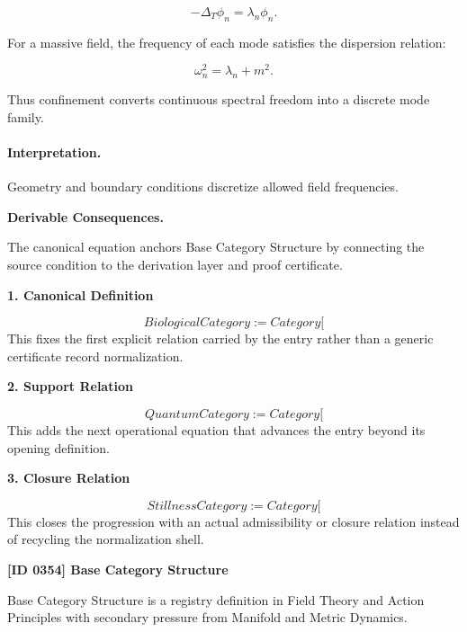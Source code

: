 \begin{equation}
-\Delta_T \phi_n = \lambda_n\phi_n .
\end{equation}

For a massive field, the frequency of each mode satisfies the dispersion relation:

\begin{equation}
\omega_n^2=\lambda_n+m^2 .
\end{equation}

Thus confinement converts continuous spectral freedom into a discrete mode family.

\paragraph{Interpretation.}
Geometry and boundary conditions discretize allowed field frequencies.

\par\vspace{0.35em}
\noindent\textbf{Derivable Consequences.}\quad
\begingroup
\footnotesize
\raggedright
The canonical equation anchors Base Category Structure by connecting the source condition to the derivation layer and proof certificate.
\par\endgroup

\noindent\textbf{1. Canonical Definition}\par
\[
BiologicalCategory := Category[
\]
\noindent This fixes the first explicit relation carried by the entry rather than a generic certificate record normalization.\par
\noindent\textbf{2. Support Relation}\par
\[
QuantumCategory := Category[
\]
\noindent This adds the next operational equation that advances the entry beyond its opening definition.\par
\noindent\textbf{3. Closure Relation}\par
\[
StillnessCategory := Category[
\]
\noindent This closes the progression with an actual admissibility or closure relation instead of recycling the normalization shell.\par

\clearpage
\noindent\textbf{[ID 0354] Base Category Structure}\par
\vspace{0.35em}
\begingroup\small
{}
Base Category Structure is a registry definition in Field Theory and Action Principles with secondary pressure from Manifold and Metric Dynamics.

